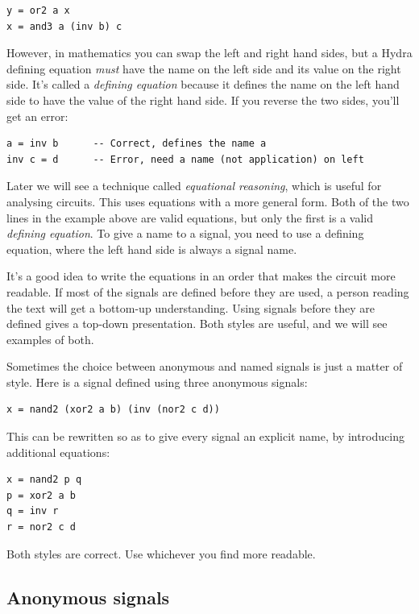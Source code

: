 \documentclass[]{svmono}
\begin{document}
\begin{verbatim}
y = or2 a x
x = and3 a (inv b) c
\end{verbatim}

However, in mathematics you can swap the left and right hand sides,
but a Hydra defining equation \emph{must} have the name on the left side
and its value on the right side.  It's called a \emph{defining equation}
because it defines the name on the left hand side to have the value of
the right hand side.  If you reverse the two sides, you'll get an
error:

\begin{verbatim}
a = inv b      -- Correct, defines the name a
inv c = d      -- Error, need a name (not application) on left
\end{verbatim}

Later we will see a technique called \emph{equational reasoning}, which is
useful for analysing circuits.  This uses equations with a more
general form. Both of the two lines in the example above are valid
equations, but only the first is a valid \emph{defining equation}.  To give
a name to a signal, you need to use a defining equation, where the
left hand side is always a signal name.

It's a good idea to write the equations in an order that makes the
circuit more readable.  If most of the signals are defined before they
are used, a person reading the text will get a bottom-up
understanding.  Using signals before they are defined gives a top-down
presentation.  Both styles are useful, and we will see examples of
both.

Sometimes the choice between anonymous and named signals is just a
matter of style.  Here is a signal defined using three anonymous
signals:

\begin{verbatim}
x = nand2 (xor2 a b) (inv (nor2 c d))
\end{verbatim}

This can be rewritten so as to give every signal an explicit name, by
introducing additional equations:

\begin{verbatim}
x = nand2 p q
p = xor2 a b
q = inv r
r = nor2 c d
\end{verbatim}

Both styles are correct.  Use whichever you find more readable.
\subsection*{Anonymous signals}
\label{sec:orgc9f17c8}
\end{document}
